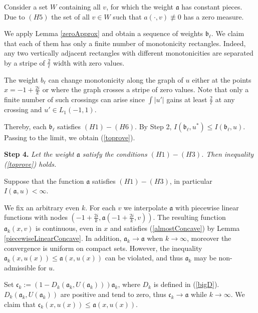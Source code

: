 \documentclass[12pt]{article}
\renewcommand{\le}{\leqslant}
\begin{document}
Consider a set $W$ containing all $v$, for which the weight $\mathfrak a$ has constant pieces.
Due to $(H5)$ the set of all  $v \in W$ such that $a(\cdot, v) \not\equiv 0$ has a zero measure.

We apply Lemma \ref{zeroApprox} and obtain a sequence of weights $\mathfrak b_{\ell}$.
We claim that each of them has only a finite number of monotonicity rectangles.
Indeed, any two vertically adjacent rectangles with different monotonicities
are separated by a stripe of $\frac{2}{\ell}$ width with zero values.

The weight $b_{\ell}$ can change monotonicity along the graph of $u$
either at the points $x = -1 + \frac{2 i}{k}$ or where the graph crosses a stripe of zero values.
Note that only a finite number of such crossings can arise since
$\int |u'|$ gains at least $\frac{2}{\ell}$ at any crossing and $u' \in L_1(-1, 1)$.

Thereby, each $\mathfrak b_{\ell}$ satisfies $(H1)-(H6)$. By Step 2, $I(\mathfrak b_{\ell}, u^*) \le I(\mathfrak b_{\ell}, u)$.
Passing to the limit, we obtain (\ref{toprove}).

\bigskip
{\bf Step 4.} {\it Let the weight $\mathfrak a$ satisfy the conditions $(H1)-(H3)$.
Then inequality (\ref{toprove}) holds.}

Suppose that the function $\mathfrak a$ satisfies $(H1)-(H3)$, in particular $I(\mathfrak a, u) < \infty$.

We fix an arbitrary even $k$.
For each $v$ we interpolate $\mathfrak a$ with piecewise linear functions
with nodes $( -1 + \frac{2i}{k}, \mathfrak a(-1 + \frac{2i}{k}, v) )$.
The resulting function $\mathfrak a_k(x, v)$ is continuous, even in $x$
and satisfies (\ref{almostConcave}) by Lemma \ref{piecewiseLinearConcave}.
In addition, $\mathfrak a_k \to \mathfrak a$ when $k \to \infty$,
moreover the convergence is uniform on compact sets.
However, the inequality $\mathfrak a_k(x, u(x)) \le \mathfrak a(x, u(x))$ can be violated,
and thus $\mathfrak a_k$ may be non-admissible for $u$.

Set $\mathfrak c_k := (1 - D_k(\mathfrak a_k, U(\mathfrak a_k))) \mathfrak a_k$, where $D_k$ is defined in (\ref{bigD}).
$D_k(\mathfrak a_k, U(\mathfrak a_k))$ are positive and tend to zero, thus $\mathfrak c_k \to \mathfrak a$ while $k \to \infty$.
We claim that $\mathfrak c_k(x, u(x)) \le \mathfrak a(x, u(x))$.
\end{document}
